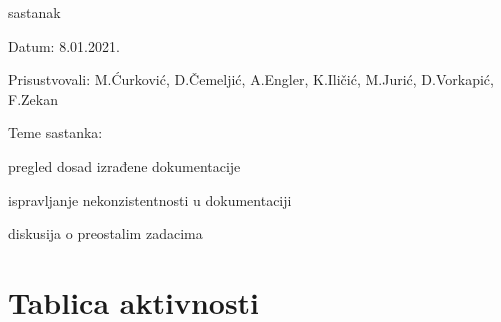 \begin{packed_enum}
	
	
	\item  sastanak
	\item[] \begin{packed_item}
		\item Datum: 8.01.2021.
		\item Prisustvovali: M.Ćurković, D.Čemeljić, A.Engler, K.Iličić, M.Jurić, D.Vorkapić, F.Zekan
		\item Teme sastanka:
		\begin{packed_item}
			\item  pregled dosad izrađene dokumentacije
			\item  ispravljanje nekonzistentnosti u dokumentaciji
			\item  diskusija o preostalim zadacima
		\end{packed_item}
	\end{packed_item}
	
	
	
	
\end{packed_enum}

\eject
\section*{Tablica aktivnosti}

